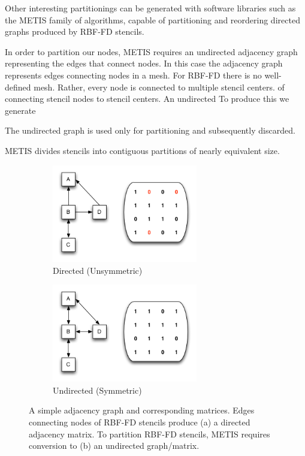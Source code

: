 \documentclass{report}
\begin{document}
Other interesting partitionings can be generated with software libraries such as the METIS \cite{Karypis1999} family of algorithms, capable of partitioning and reordering directed graphs produced by RBF-FD stencils. 





In order to partition our nodes, METIS requires an undirected adjacency graph representing the edges that connect nodes. In this case the adjacency graph represents edges connecting nodes in a mesh. For RBF-FD there is no well-defined mesh. Rather, every node is connected to multiple stencil centers.  of connecting stencil nodes to stencil centers. An undirected  To produce this we generate 

The undirected graph is used only for partitioning and subsequently discarded. 

METIS divides stencils into contiguous partitions of nearly equivalent size. 

\begin{figure}[ht!]
\begin{center}
\begin{subfigure}[b]{0.425\textwidth}
\includegraphics[width=2.5in]{../figures/omnigraffle/DirectedAdjacencyGraph.png}
\caption{Directed (Unsymmetric)}
\label{fig:directed_graph}
\end{subfigure}
\begin{subfigure}[b]{0.425\textwidth}
\includegraphics[width=2.5in]{../figures/omnigraffle/UndirectedAdjacencyGraph.png}
\caption{Undirected (Symmetric)}
\label{fig:undirected_graph}
\end{subfigure}
\caption{A simple adjacency graph and corresponding matrices. Edges connecting nodes of RBF-FD stencils produce (a) a directed adjacency matrix. To partition RBF-FD stencils, METIS requires conversion to (b) an undirected graph/matrix.}
\label{fig:adjacency_matrix}
\end{center}
\end{figure}
\end{document}
